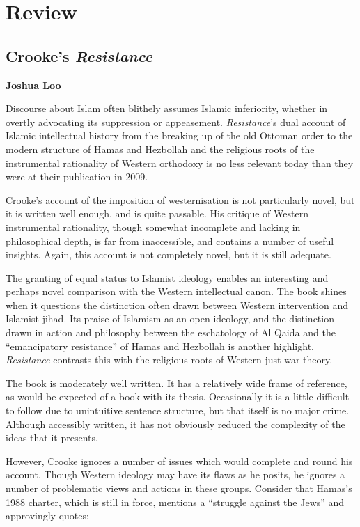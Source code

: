 \documentclass[12pt,a4paper]{report}
\newcounter{count}
\begin{document}
\begin{multicols}{2}
\begin{multicols}{2}
\end{multicols}

\chapter{Review}

\section{Crooke's \textit{Resistance}}
\textbf{Joshua Loo}

\begin{multicols}{2}

Discourse about Islam often blithely assumes Islamic inferiority,
whether in overtly advocating its suppression or appeasement.
\textit{Resistance}'s dual account of Islamic intellectual history from
the breaking up of the old Ottoman order to the modern structure of
Hamas and Hezbollah and the religious roots of the instrumental
rationality of Western orthodoxy is no less relevant today than they
were at their publication in 2009.

Crooke's account of the imposition of westernisation is not particularly
novel, but it is written well enough, and is quite passable. His
critique of Western instrumental rationality, though somewhat incomplete
and lacking in philosophical depth, is far from inaccessible, and
contains a number of useful insights. Again, this account is not
completely novel, but it is still adequate.

The granting of equal status to Islamist ideology enables an interesting
and perhaps novel comparison with the Western intellectual canon. The
book shines when it questions the distinction often drawn between
Western intervention and Islamist jihad. Its praise of Islamism as an
open ideology, and the distinction drawn in action and philosophy
between the eschatology of Al Qaida and the ``emancipatory resistance''
of Hamas and Hezbollah is another highlight. \textit{Resistance} contrasts
this with the religious roots of Western just war theory.

The book is moderately well written. It has a relatively wide frame of
reference, as would be expected of a book with its thesis. Occasionally
it is a little difficult to follow due to unintuitive sentence
structure, but that itself is no major crime. Although accessibly
written, it has not obviously reduced the complexity of the ideas that
it presents.

However, Crooke ignores a number of issues which would complete and
round his account. Though Western ideology may have its flaws as he
posits, he ignores a number of problematic views and actions in these
groups. Consider that Hamas's 1988 charter, which is still in force,
mentions a ``struggle against the Jews'' and approvingly quotes:


\end{multicols}
\end{multicols}
\end{document}
